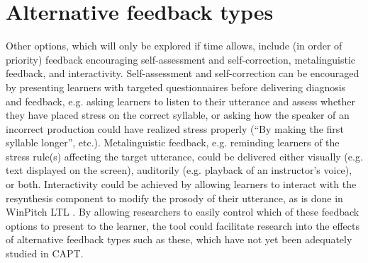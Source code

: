  



%	
	
	
	
\section{Alternative feedback types}
\label{sec:fb:alternative}

Other options, which will only be explored if time allows, include (in order of priority) feedback encouraging self-assessment and self-correction, metalinguistic feedback, and interactivity. %
 	Self-assessment and self-correction can be encouraged by presenting learners with targeted questionnaires before delivering diagnosis and feedback, e.g. asking learners to listen to their utterance and assess whether they have placed stress on the correct syllable, or 
 	asking how the speaker of an incorrect production could have realized stress properly (``By making the first syllable longer'', etc.). 
	Metalinguistic feedback, e.g. reminding learners %
of the stress rule(s) affecting the target utterance, could be delivered either visually (e.g. text displayed on the screen), auditorily (e.g. playback of an instructor's voice), or both. 
 	Interactivity could be achieved by allowing learners to interact with the resynthesis component to modify the prosody of their utterance, as is done in WinPitch LTL \citep{Martin2004}. %
 	By allowing researchers to easily control which of these feedback options to present to the learner, the tool could facilitate research into the effects of alternative feedback types such as these, which have not yet been adequately studied in CAPT.
 

